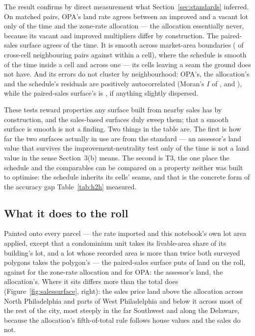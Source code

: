 \documentclass[11pt]{article}
\begin{document}
The result confirms by direct measurement what Section~\ref{sec:standards} inferred. On
\LycdTOnePairs{} matched pairs, OPA's land rate agrees between an improved and a vacant lot only
\LycdSzeroTOne{} of the time and the zone-rate allocation \LycdSoneTOne{} --- the allocation
essentially never, because its vacant and improved multipliers differ by construction. The
paired-sales surface agrees \LycdSfiveTOne{} of the time. It is smooth across market-area
boundaries (\LycdSfiveTThreeCross{} of cross-cell neighbouring pairs against
\LycdSfiveTThreeWithin{} within a cell), where the schedule is smooth \LycdSthreeTThreeWithin{} of
the time inside a cell and \LycdSthreeTThreeCross{} across one --- its cells leaving a seam the
ground does not have. And its errors do not cluster by neighbourhood: OPA's, the allocation's and
the schedule's residuals are positively autocorrelated (Moran's $I$ of \LycdSzeroTFour{},
\LycdSoneTFour{} and \LycdSthreeTFour{}), while the paired-sales surface's is \LycdSfiveTFour{},
if anything slightly dispersed.

These tests reward properties any surface built from nearby sales has by construction, and the
sales-based surfaces duly sweep them; that a smooth surface is smooth is not a finding. Two
things in the table are. The first is how far the two surfaces actually in use are from the
standard --- an assessor's land value that survives the improvement-neutrality test only
\LycdSzeroTOne{} of the time is not a land value in the sense Section~3(b) means. The second is T3, the one place the
schedule and the comparables can be compared on a property neither was built to optimise: the
schedule inherits its cells' seams, and that is the concrete form of the accuracy gap
Table~\ref{tab:h2h} measured.

\subsection{What it does to the roll}

Painted onto every parcel --- the rate imported and this notebook's own lot area applied, except
that a condominium unit takes its livable-area share of its building's lot, and a lot whose
recorded area is more than twice both surveyed polygons takes the polygon's --- the
paired-sales surface puts \LycdSfiveLandBaseB{} of land on the roll, against
\LycdLycdLandBaseB{} for the zone-rate allocation and \LycdOpaLandBaseB{} for OPA:
\LycdSfiveOverOpaLand{} the assessor's land, \LycdSfiveOverLycdLand{} the allocation's. Where it
sits differs more than the total does (Figure~\ref{fig:salessurface}, right): the sales price land above
the allocation across North Philadelphia and parts of West Philadelphia and below it across most
of the rest of the city, most steeply in the far Southwest and along the Delaware, because the
allocation's fifth-of-total rule follows house values and the sales do not.
\end{document}
